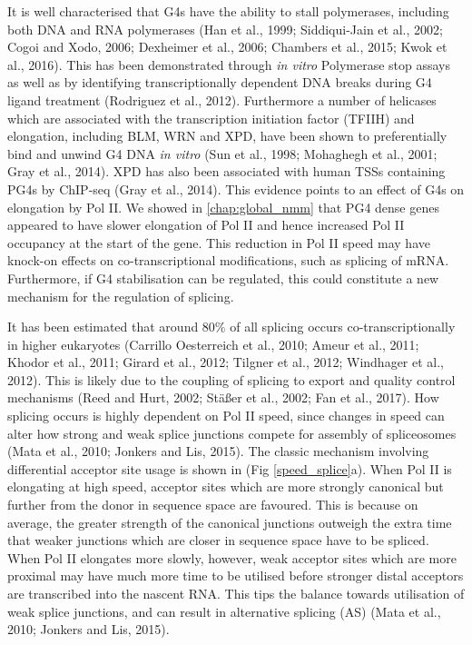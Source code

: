 \documentclass[12pt,a4paper,]{report}
\begin{document}
It is well characterised that G4s have the ability to stall polymerases,
including both DNA and RNA polymerases (Han et al., 1999; Siddiqui-Jain
et al., 2002; Cogoi and Xodo, 2006; Dexheimer et al., 2006; Chambers et
al., 2015; Kwok et al., 2016). This has been demonstrated through
\emph{in vitro} Polymerase stop assays as well as by identifying
transcriptionally dependent DNA breaks during G4 ligand treatment
(Rodriguez et al., 2012). Furthermore a number of helicases which are
associated with the transcription initiation factor (TFIIH) and
elongation, including BLM, WRN and XPD, have been shown to
preferentially bind and unwind G4 DNA \emph{in vitro} (Sun et al., 1998;
Mohaghegh et al., 2001; Gray et al., 2014). XPD has also been associated
with human TSSs containing PG4s by ChIP-seq (Gray et al., 2014). This
evidence points to an effect of G4s on elongation by Pol II. We showed
in \autoref{chap:global_nmm} that PG4 dense genes appeared to have
slower elongation of Pol II and hence increased Pol II occupancy at the
start of the gene. This reduction in Pol II speed may have knock-on
effects on co-transcriptional modifications, such as splicing of mRNA.
Furthermore, if G4 stabilisation can be regulated, this could constitute
a new mechanism for the regulation of splicing.

It has been estimated that around 80\% of all splicing occurs
co-transcriptionally in higher eukaryotes (Carrillo Oesterreich et al.,
2010; Ameur et al., 2011; Khodor et al., 2011; Girard et al., 2012;
Tilgner et al., 2012; Windhager et al., 2012). This is likely due to the
coupling of splicing to export and quality control mechanisms (Reed and
Hurt, 2002; Stäßer et al., 2002; Fan et al., 2017). How splicing occurs
is highly dependent on Pol II speed, since changes in speed can alter
how strong and weak splice junctions compete for assembly of
spliceosomes (Mata et al., 2010; Jonkers and Lis, 2015). The classic
mechanism involving differential acceptor site usage is shown in (Fig
\ref{speed_splice}a). When Pol II is elongating at high speed, acceptor
sites which are more strongly canonical but further from the donor in
sequence space are favoured. This is because on average, the greater
strength of the canonical junctions outweigh the extra time that weaker
junctions which are closer in sequence space have to be spliced. When
Pol II elongates more slowly, however, weak acceptor sites which are
more proximal may have much more time to be utilised before stronger
distal acceptors are transcribed into the nascent RNA. This tips the
balance towards utilisation of weak splice junctions, and can result in
alternative splicing (AS) (Mata et al., 2010; Jonkers and Lis, 2015).
\end{document}
